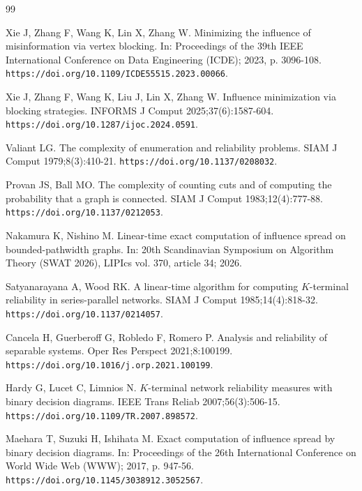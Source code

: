 \documentclass[preprint,11pt]{elsarticle}
\theoremstyle{definition}
\theoremstyle{remark}
\begin{document}
\begin{thebibliography}{99}
\providecommand{\natexlab}[1]{#1}
\providecommand{\url}[1]{\texttt{#1}}

Xie J, Zhang F, Wang K, Lin X, Zhang W. Minimizing the influence of misinformation via vertex blocking. In: Proceedings of the 39th IEEE International Conference on Data Engineering (ICDE); 2023, p. 3096-108. \url{https://doi.org/10.1109/ICDE55515.2023.00066}.

Xie J, Zhang F, Wang K, Liu J, Lin X, Zhang W. Influence minimization via blocking strategies. INFORMS J Comput 2025;37(6):1587-604. \url{https://doi.org/10.1287/ijoc.2024.0591}.

Valiant LG. The complexity of enumeration and reliability problems. SIAM J Comput 1979;8(3):410-21. \url{https://doi.org/10.1137/0208032}.

Provan JS, Ball MO. The complexity of counting cuts and of computing the probability that a graph is connected. SIAM J Comput 1983;12(4):777-88. \url{https://doi.org/10.1137/0212053}.

Nakamura K, Nishino M. Linear-time exact computation of influence spread on bounded-pathwidth graphs. In: 20th Scandinavian Symposium on Algorithm Theory (SWAT 2026), LIPIcs vol. 370, article 34; 2026.

Satyanarayana A, Wood RK. A linear-time algorithm for computing $K$-terminal reliability in series-parallel networks. SIAM J Comput 1985;14(4):818-32. \url{https://doi.org/10.1137/0214057}.

Cancela H, Guerberoff G, Robledo F, Romero P. Analysis and reliability of separable systems. Oper Res Perspect 2021;8:100199. \url{https://doi.org/10.1016/j.orp.2021.100199}.

Hardy G, Lucet C, Limnios N. $K$-terminal network reliability measures with binary decision diagrams. IEEE Trans Reliab 2007;56(3):506-15. \url{https://doi.org/10.1109/TR.2007.898572}.

Maehara T, Suzuki H, Ishihata M. Exact computation of influence spread by binary decision diagrams. In: Proceedings of the 26th International Conference on World Wide Web (WWW); 2017, p. 947-56. \url{https://doi.org/10.1145/3038912.3052567}.


\end{thebibliography}
\end{document}
